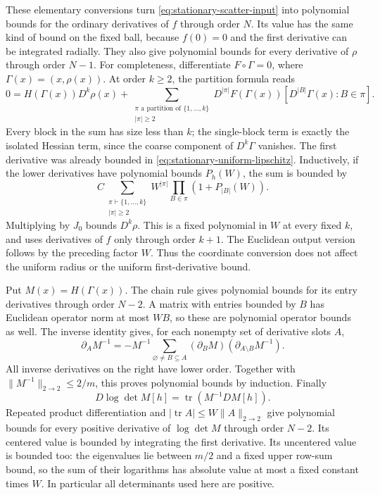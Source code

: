 These elementary conversions turn
\eqref{eq:stationary-scatter-input} into polynomial bounds for the
ordinary derivatives of $f$ through order $N$. Its value has the
same kind of bound on the fixed ball, because $f(0)=0$ and the
first derivative can be integrated radially.
They also give polynomial bounds for every derivative of $\rho$
through order $N-1$. For completeness, differentiate
$F\circ\Gamma=0$, where $\Gamma(x)=(x,\rho(x))$.
At order $k\ge2$, the partition formula reads
\[
 0=H(\Gamma(x))D^k\rho(x)
   +\sum_{\substack{\pi\text{ a partition of }\{1,\ldots,k\}\\
                    |\pi|\ge2}}
       D^{|\pi|}F(\Gamma(x))
                       [D^{|B|}\Gamma(x):B\in\pi].
\]
Every block in the sum has size less than $k$; the single-block
term is exactly the isolated Hessian term, since the coarse
component of $D^k\Gamma$ vanishes. The first derivative was already
bounded in \eqref{eq:stationary-uniform-lipschitz}. Inductively,
if the lower derivatives have polynomial bounds $P_h(W)$, the sum
is bounded by
\[
 C\sum_{\substack{\pi\vdash\{1,\ldots,k\}\\|\pi|\ge2}}
       W^{|\pi|}\prod_{B\in\pi}(1+P_{|B|}(W)).
\]
Multiplying by $J_0$ bounds $D^k\rho$. This is a fixed polynomial
in $W$ at every fixed $k$, and uses derivatives of $f$ only through
order $k+1$. The Euclidean output version follows by the preceding
factor $W$. Thus the coordinate conversion does not affect the
uniform radius or the uniform first-derivative bound.

Put $M(x)=H(\Gamma(x))$. The chain rule gives polynomial bounds
for its entry derivatives through order $N-2$. A matrix with
entries bounded by $B$ has Euclidean operator norm at most $WB$,
so these are polynomial operator bounds as well. The inverse
identity gives, for each nonempty set of derivative slots $A$,
\[
 \partial_A M^{-1}
   =-M^{-1}\sum_{\varnothing\ne B\subseteq A}
                   (\partial_BM)(\partial_{A\setminus B}M^{-1}).
\]
All inverse derivatives on the right have lower order.
Together with $\|M^{-1}\|_{2\to2}\le2/m$, this proves polynomial
bounds by induction. Finally
\[
        D\log\det M[h]=\operatorname{tr}(M^{-1}DM[h]).
\]
Repeated product differentiation and
$|\operatorname{tr}A|\le W\|A\|_{2\to2}$ give polynomial bounds
for every positive derivative of $\log\det M$ through order
$N-2$. Its centered value is bounded by integrating the first
derivative. Its uncentered value is bounded too: the eigenvalues
lie between $m/2$ and a fixed upper row-sum bound, so the sum of
their logarithms has absolute value at most a fixed constant times
$W$. In particular all determinants used here are positive.

